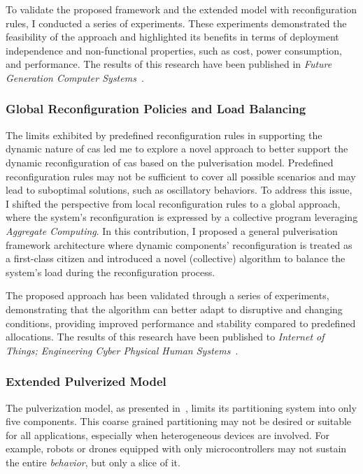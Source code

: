 \documentclass[runningheads]{llncs}
\begin{document}
To validate the proposed framework and the extended model with reconfiguration rules,
I conducted a series of experiments.
%
These experiments demonstrated the feasibility of the approach and highlighted its benefits in terms of deployment independence and non-functional properties,
such as cost,
power consumption,
and performance.
%
The results of this research have been published in \emph{Future Generation Computer Systems}~\cite{DBLP:journals/fgcs/FarabegoliPCV24}.

\subsubsection{Global Reconfiguration Policies and Load Balancing}
The limits exhibited by predefined reconfiguration rules in supporting the dynamic nature of \ac{cas} led me to explore a novel approach to better support the dynamic reconfiguration of \ac{cas} based on the pulverisation model.
%
Predefined reconfiguration rules may not be sufficient to cover all possible scenarios and may lead to suboptimal solutions,
such as oscillatory behaviors.
%
To address this issue,
I shifted the perspective from local reconfiguration rules to a global approach,
where the system's reconfiguration is expressed by a collective program leveraging \emph{Aggregate Computing}.
%
In this contribution,
I proposed a general pulverisation framework architecture where dynamic components' reconfiguration is treated as a first-class citizen and introduced a novel (collective) algorithm to balance the system's load during the reconfiguration process.

The proposed approach has been validated through a series of experiments,
demonstrating that the algorithm can better adapt to disruptive and changing conditions,
providing improved performance and stability compared to predefined allocations.
%
The results of this research have been published to \emph{Internet of Things; Engineering Cyber Physical Human Systems}~\cite{DBLP:journals/iot/FarabegoliPCV24}.

\subsubsection{Extended Pulverized Model}
The pulverization model,
as presented in~\cite{DBLP:journals/fi/CasadeiPPVW20},
limits its partitioning system into only five components.
%
This coarse grained partitioning may not be desired or suitable for all applications,
especially when heterogeneous devices are involved.
%
For example,
robots or drones equipped with only microcontrollers may not sustain the entire \emph{behavior},
but only a slice of it.
\end{document}
